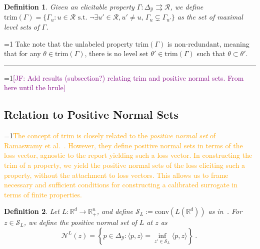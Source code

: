 \documentclass[12pt]{article}
\newcommand{\Comments}{1}
\newcommand{\mynote}[2]{\ifnum\Comments=1\textcolor{#1}{#2}\fi}
\newcommand{\mytodo}[2]{\ifnum\Comments=1%
  \todo[linecolor=#1!80!black,backgroundcolor=#1,bordercolor=#1!80!black]{#2}\fi}
\newcommand{\jessie}[1]{\mynote{purple}{[JF: #1]}}
\newcommand{\proposedadd}[1]{\mynote{orange}{#1}}
\newcommand{\btw}[1]{\mytodo{gray!20!white}{[BTW: #1]}}%
\newcommand{\reals}{\mathbb{R}}
\newcommand{\simplex}{\Delta_\Y}
\newcommand{\N}{\mathcal{N}}
\newcommand{\R}{\mathcal{R}}
\renewcommand{\S}{\mathcal{S}}
\newcommand{\Y}{\mathcal{Y}}
\newcommand{\inprod}[2]{\langle #1, #2 \rangle}%
\newcommand{\toto}{\rightrightarrows}
\newcommand{\trim}{\mathrm{trim}}
\newcommand{\conv}{\mathrm{conv}}
\newtheorem{definition}{Definition}
\begin{document}
\begin{definition}\label{def:trim}
  Given an elicitable property $\Gamma:\simplex \toto\R$, we define $\trim(\Gamma) = \{\Gamma_u : u \in \R \text{ s.t. } \neg\exists u'\in\R,u'\neq u,\, \Gamma_u \subsetneq \Gamma_{u'}\}$ as the set of maximal level sets of $\Gamma$.
\end{definition}

\btw{RF: Note for later: should be able to show that the union of trim is the simplex.\jessie{This is part of the proposition statement 2 now.}}
Take note that the unlabeled property $\trim(\Gamma)$ is non-redundant, meaning that for any $\theta \in \trim(\Gamma)$, there is no level set $\theta' \in \trim(\Gamma)$ such that $\theta \subset \theta'$.

\hrule
\bigskip
\jessie{Add results (subsection?) relating trim and positive normal sets.  From here until the hrule}
\subsection{Relation to Positive Normal Sets}

\proposedadd{The concept of $\trim$ is closely related to the \emph{positive normal set} of Ramaswamy et al.~\cite{ramaswamy2016convex}.
However, they define positive normal sets in terms of the loss vector, agnostic to the report yielding such a loss vector.
In constructing the $\trim$ of a property, we yield the positive normal sets of the loss eliciting such a property, without the attachment to loss vectors.
This allows us to frame necessary and sufficient conditions for constructing a calibrated surrogate in terms of finite properties.}


\begin{definition}
	Let $L:\reals^d \to \reals^n_+$, and define $\S_L := \conv(L(\reals^d))$ as in~\cite[Definition 8]{ramaswamy2016convex}.
	For $z \in \S_L$, we define the \emph{positive normal set} of $L$ at $z$ as
	\begin{equation}
	\N^L(z) = \left\{ p \in \simplex: \inprod{p}{z} = \inf_{z' \in \S_L} \inprod{p}{z} \right\}~.~
	\end{equation}
\end{definition}
\end{document}

